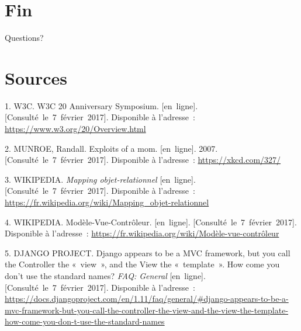 \hypertarget{fin}{%
\section{Fin}\label{fin}}

Questions?

\hypertarget{sources}{%
\section*{Sources}\label{sources}}

\hypertarget{refs}{}
\begin{cslreferences}
\leavevmode\hypertarget{ref-w3c:20}{}%
1. W3C. W3C 20 Anniversary Symposium. {[}en~ligne{]}.
{[}Consulté~le~7~février~2017{]}. Disponible à l'adresse~:
\url{https://www.w3.org/20/Overview.html}

\leavevmode\hypertarget{ref-xkcd:327}{}%
2. MUNROE, Randall. Exploits of a mom. {[}en~ligne{]}. 2007.
{[}Consulté~le~7~février~2017{]}. Disponible à l'adresse~:
\url{https://xkcd.com/327/}

\leavevmode\hypertarget{ref-wiki:orm}{}%
3. WIKIPEDIA. \emph{Mapping objet-relationnel} {[}en~ligne{]}.
{[}Consulté~le~7~février~2017{]}. Disponible à l'adresse~:
\url{https://fr.wikipedia.org/wiki/Mapping_objet-relationnel}

\leavevmode\hypertarget{ref-wiki:mvc}{}%
4. WIKIPEDIA. Modèle-Vue-Contrôleur. {[}en~ligne{]}.
{[}Consulté~le~7~février~2017{]}. Disponible à l'adresse~:
\url{https://fr.wikipedia.org/wiki/Modèle-vue-contrôleur}

\leavevmode\hypertarget{ref-django:mtv}{}%
5. DJANGO PROJECT. Django appears to be a MVC framework, but you call
the Controller the «~view~», and the View the «~template~». How come you
don't use the standard names? \emph{FAQ: General} {[}en~ligne{]}.
{[}Consulté~le~7~février~2017{]}. Disponible à l'adresse~:
\url{https://docs.djangoproject.com/en/1.11/faq/general/\#django-appears-to-be-a-mvc-framework-but-you-call-the-controller-the-view-and-the-view-the-template-how-come-you-don-t-use-the-standard-names}
\end{cslreferences}
